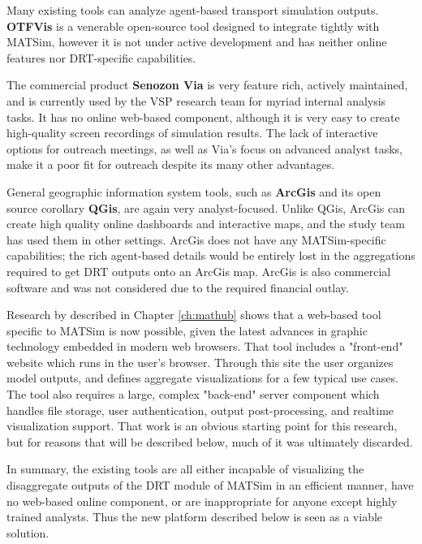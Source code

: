 Many existing tools can analyze agent-based transport simulation outputs. \textbf{OTFVis} \cite{Srippgen2015OTFVisInBook} is a venerable open-source tool designed to integrate tightly with MATSim, however it is not under active development and has neither online features nor DRT-specific capabilities.

The commercial product \textbf{Senozon Via} \cite{Rieser2015SenozonViaInBook} is very feature rich, actively maintained, and is currently used by the VSP research team for myriad internal analysis tasks. It has no online web-based component, although it is very easy to create high-quality screen recordings of simulation results. The lack of interactive options for outreach meetings, as well as Via's focus on advanced analyst tasks, make it a poor fit for outreach despite its many other advantages.

General geographic information system tools, such as \textbf{ArcGis} and its open source corollary \textbf{QGis}, are again very analyst-focused. Unlike QGis, ArcGis can create high quality online dashboards and interactive maps, and the study team has used them in other settings. ArcGis does not have any MATSim-specific capabilities; the rich agent-based details would be entirely lost in the aggregations required to get DRT outputs onto an ArcGis map. ArcGis is also commercial software and was not considered due to the required financial outlay.

Research by \citet{CharltonLaudan2020WebBasedVisualization} described in Chapter \ref{ch:mathub} shows that a web-based tool specific to MATSim is now possible, given the latest advances in graphic technology embedded in modern web browsers. That tool includes a "front-end" website which runs in the user's browser. Through this site the user organizes model outputs, and defines aggregate visualizations for a few typical use cases. The tool also requires a large, complex "back-end" server component which handles file storage, user authentication, output post-processing, and realtime visualization support. That work is an obvious starting point for this research, but for reasons that will be described below, much of it was ultimately discarded.

In summary, the existing tools are all either incapable of visualizing the disaggregate outputs of the DRT module of MATSim in an efficient manner, have no web-based online component, or are inappropriate for anyone except highly trained analysts. Thus the new platform described below is seen as a viable solution.

